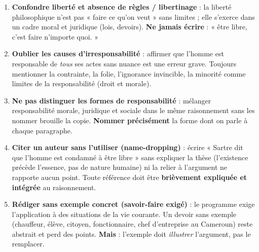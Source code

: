 \documentclass[11pt]{article}
\begin{document}
\begin{attention}
\begin{enumerate}
\item \textbf{Confondre liberté et absence de règles / libertinage} : la liberté philosophique n'est pas « faire ce qu'on veut » sans limites ; elle s'exerce dans un cadre moral et juridique (lois, devoirs). \textbf{Ne jamais écrire} : « être libre, c'est faire n'importe quoi. »
\item \textbf{Oublier les causes d'irresponsabilité} : affirmer que l'homme est responsable de \emph{tous} ses actes sans nuance est une erreur grave. Toujours mentionner la contrainte, la folie, l'ignorance invincible, la minorité comme limites de la responsabilité (droit et morale).
\item \textbf{Ne pas distinguer les formes de responsabilité} : mélanger responsabilité morale, juridique et sociale dans le même raisonnement sans les nommer brouille la copie. \textbf{Nommer précisément} la forme dont on parle à chaque paragraphe.
\item \textbf{Citer un auteur sans l'utiliser (name-dropping)} : écrire « Sartre dit que l'homme est condamné à être libre » sans expliquer la thèse (l'existence précède l'essence, pas de nature humaine) ni la relier à l'argument ne rapporte aucun point. Toute référence doit être \textbf{brièvement expliquée et intégrée} au raisonnement.
\item \textbf{Rédiger sans exemple concret (savoir-faire exigé)} : le programme exige l'application à des situations de la vie courante. Un devoir sans exemple (chauffeur, élève, citoyen, fonctionnaire, chef d'entreprise au Cameroun) reste abstrait et perd des points. \textbf{Mais} : l'exemple doit \emph{illustrer} l'argument, pas le remplacer.
\end{enumerate}
\end{attention}
\end{document}
